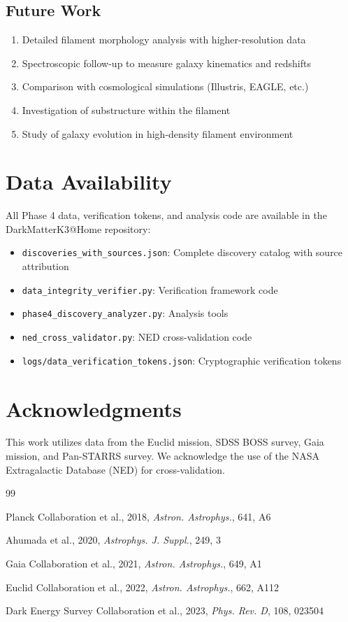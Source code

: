 \documentclass[11pt,a4paper]{article}
\begin{document}
\subsection{Future Work}

\begin{enumerate}
\item Detailed filament morphology analysis with higher-resolution data
\item Spectroscopic follow-up to measure galaxy kinematics and redshifts
\item Comparison with cosmological simulations (Illustris, EAGLE, etc.)
\item Investigation of substructure within the filament
\item Study of galaxy evolution in high-density filament environment
\end{enumerate}

\section{Data Availability}

All Phase 4 data, verification tokens, and analysis code are available in the DarkMatterK3@Home repository:

\begin{itemize}
\item \texttt{discoveries\_with\_sources.json}: Complete discovery catalog with source attribution
\item \texttt{data\_integrity\_verifier.py}: Verification framework code
\item \texttt{phase4\_discovery\_analyzer.py}: Analysis tools
\item \texttt{ned\_cross\_validator.py}: NED cross-validation code
\item \texttt{logs/data\_verification\_tokens.json}: Cryptographic verification tokens
\end{itemize}

\section*{Acknowledgments}

This work utilizes data from the Euclid mission, SDSS BOSS survey, Gaia mission, and Pan-STARRS survey. We acknowledge the use of the NASA Extragalactic Database (NED) for cross-validation.

\begin{thebibliography}{99}

 Planck Collaboration et al., 2018, \textit{Astron. Astrophys.}, 641, A6

 Ahumada et al., 2020, \textit{Astrophys. J. Suppl.}, 249, 3

 Gaia Collaboration et al., 2021, \textit{Astron. Astrophys.}, 649, A1

 Euclid Collaboration et al., 2022, \textit{Astron. Astrophys.}, 662, A112

 Dark Energy Survey Collaboration et al., 2023, \textit{Phys. Rev. D}, 108, 023504

\end{thebibliography}
\end{document}
